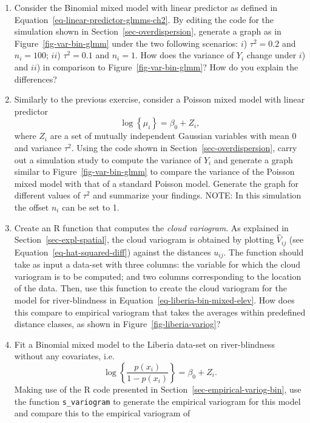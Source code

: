 \documentclass[
  letterpaper,
]{krantz}
\begin{document}
\begin{enumerate}
\def\labelenumi{\arabic{enumi}.}
\item
  Consider the Binomial mixed model with linear predictor as defined in
  Equation~\ref{eq-linear-predictor-glmms-ch2}. By editing the code for
  the simulation shown in Section~\ref{sec-overdispersion}, generate a
  graph as in Figure~\ref{fig-var-bin-glmm} under the two following
  scenarios: \(i\)) \(\tau^2 = 0.2\) and \(n_i=100\); \(ii\))
  \(\tau^2 = 0.1\) and \(n_i = 1\). How does the variance of \(Y_i\)
  change under \(i\)) and \(ii\)) in comparison to
  Figure~\ref{fig-var-bin-glmm}? How do you explain the differences?
\item
  Similarly to the previous exercise, consider a Poisson mixed model
  with linear predictor \[
  \log\left\{\mu_i\right\} = \beta_0 + Z_i,
  \] where \(Z_i\) are a set of mutually independent Gaussian variables
  with mean 0 and variance \(\tau^2\). Using the code shown in
  Section~\ref{sec-overdispersion}, carry out a simulation study to
  compute the variance of \(Y_i\) and generate a graph similar to
  Figure~\ref{fig-var-bin-glmm} to compare the variance of the Poisson
  mixed model with that of a standard Poisson model. Generate the graph
  for different values of \(\tau^2\) and summarize your findings. NOTE:
  In this simulation the offset \(n_i\) can be set to 1.
\item
  Create an R function that computes the \emph{cloud variogram}. As
  explained in Section~\ref{sec-expl-spatial}, the cloud variogram is
  obtained by plotting \(\hat{V}_{ij}\) (see
  Equation~\ref{eq-hat-squared-diff}) against the distances \(u_{ij}\).
  The function should take as input a data-set with three columns: the
  variable for which the cloud variogram is to be computed; and two
  columns corresponding to the location of the data. Then, use this
  function to create the cloud variogram for the model for
  river-blindness in Equation~\ref{eq-liberia-bin-mixed-elev}. How does
  this compare to empirical variogram that takes the averages within
  predefined distance classes, as shown in
  Figure~\ref{fig-liberia-variog}?
\item
  Fit a Binomial mixed model to the Liberia data-set on river-blindness
  without any covariates, i.e.~\[
  \log\left\{\frac{p(x_i)}{1-p(x_i)}\right\} = \beta_0 + Z_i.
  \] Making use of the R code presented in
  Section~\ref{sec-empirical-variog-bin}, use the function
  \texttt{s\_variogram} to generate the empirical variogram for this
  model and compare this to the empirical variogram of

\end{enumerate}
\end{document}
